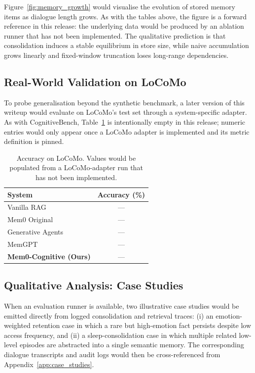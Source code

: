 Figure~\ref{fig:memory_growth} would visualise the evolution of stored
memory items as dialogue length grows. As with the tables above, the
figure is a forward reference in this release: the underlying data
would be produced by an ablation runner that has not been implemented.
The qualitative prediction is that consolidation induces a stable
equilibrium in store size, while naive accumulation grows linearly and
fixed-window truncation loses long-range dependencies.

\subsection{Real-World Validation on LoCoMo}
\label{subsec:locomo_results}

To probe generalisation beyond the synthetic benchmark, a later version
of this writeup would evaluate on LoCoMo's test set through a
system-specific adapter. As with CognitiveBench, Table~\ref{tab:locomo}
is intentionally empty in this release; numeric entries would only
appear once a LoCoMo adapter is implemented and its metric definition is
pinned.

\begin{table}[h]
\centering
\small
\begin{tabular}{lc}
\toprule
\textbf{System} & \textbf{Accuracy (\%)} \\
\midrule
Vanilla RAG & --- \\
Mem0 Original & --- \\
Generative Agents & --- \\
MemGPT & --- \\
\midrule
\textbf{Mem0-Cognitive (Ours)} & --- \\
\bottomrule
\end{tabular}
\caption{Accuracy on LoCoMo. Values would be populated from a
LoCoMo-adapter run that has not been implemented.}
\label{tab:locomo}
\end{table}

\subsection{Qualitative Analysis: Case Studies}
\label{subsec:case_studies}

When an evaluation runner is available, two illustrative case studies
would be emitted directly from logged consolidation and retrieval
traces: (i) an emotion-weighted retention case in which a rare but
high-emotion fact persists despite low access frequency, and (ii) a
sleep-consolidation case in which multiple related low-level episodes
are abstracted into a single semantic memory. The corresponding
dialogue transcripts and audit logs would then be cross-referenced from
Appendix~\ref{app:case_studies}.

